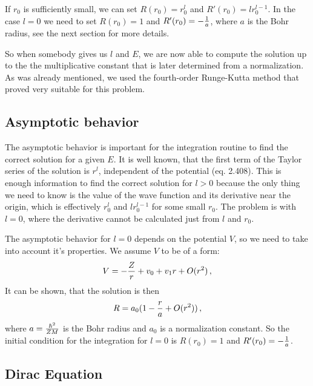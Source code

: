 If $r_0$ is sufficiently small, we can set $R(r_0)=r_0^l$ and
$R'(r_0)=lr_0^{l-1}$. In the case $l=0$ we need to set $R(r_0)=1$ and
$R'(r_0)=-{1\over a}$, where $a$ is the Bohr radius, see the next
section for more details.

So when somebody gives us $l$ and $E$, we are now able to compute the solution
up to the the multiplicative constant that is later determined from a
normalization. As was already mentioned, we used the fourth-order Runge-Kutta
method that proved very suitable for this problem. 


\subsection{Asymptotic behavior}

The asymptotic behavior is important for the integration routine to find
the correct solution for a given $E$. 
It is well known, that the first
term of the Taylor series of the solution is $r^l$, independent
of the potential \cite{formanek} (eq. 2.408). This is enough
information to find the correct solution for $l>0$ because the only
thing we need to know is the value of the wave function and its derivative
near the origin, which is effectively $r_0^l$ and $lr_0^{l-1}$ for some small
$r_0$. The problem is with $l=0$, where the
derivative cannot be calculated just from $l$ and $r_0$. 

The asymptotic behavior for $l=0$ depends on the potential $V$, so we need to
take into account it's properties. We assume $V$ to be of a form:
$$V=-{Z\over r}+v_0 + v_1r + O(r^2)\,,$$
It can be shown, that the solution is then
$$R=a_0(1-{r\over a}+O(r^2))\,,$$
where $a={\hbar^2\over ZM}$ is the Bohr radius and $a_0$ is a normalization
constant. So the initial condition for the integration for $l=0$ is $R(r_0)=1$
and
$R'(r_0)=-{1\over a}$.

\subsection{Dirac Equation}


